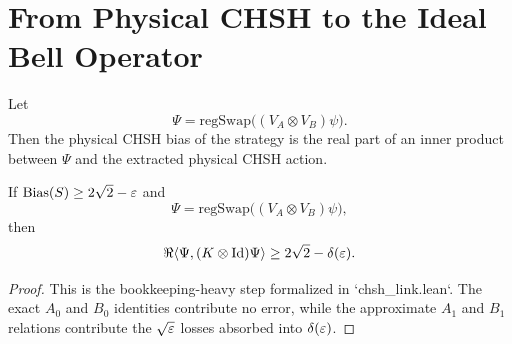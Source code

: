 \section{From Physical CHSH to the Ideal Bell Operator}

\begin{lemma}
\label{lem:chsh-bias-regswap}
Let
\[
\Psi = \mathrm{regSwap}\bigl((V_A \otimes V_B)\psi\bigr).
\]
Then the physical CHSH bias of the strategy is the real part of an inner product between $\Psi$ and the extracted physical CHSH action.
\end{lemma}

\begin{theorem}
\label{thm:chsh-to-k}
If $\operatorname{Bias}(S) \ge 2\sqrt{2} - \varepsilon$ and
\[
\Psi = \mathrm{regSwap}\bigl((V_A \otimes V_B)\psi\bigr),
\]
then
\[
\Re \langle \Psi, (K \otimes \mathrm{Id})\Psi \rangle
\ge 2\sqrt{2} - \delta(\varepsilon).
\]
\end{theorem}

\begin{proof}
This is the bookkeeping-heavy step formalized in `chsh_link.lean`.
The exact $A_0$ and $B_0$ identities contribute no error, while the approximate $A_1$ and $B_1$ relations contribute the $\sqrt{\varepsilon}$ losses absorbed into $\delta(\varepsilon)$.
\end{proof}
